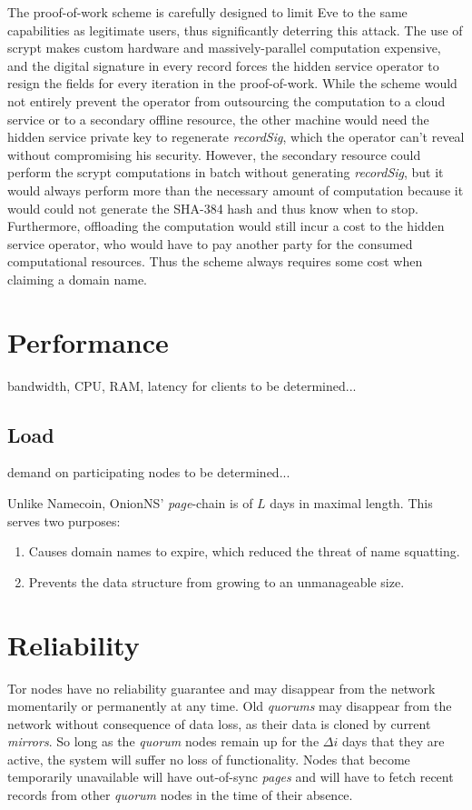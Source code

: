 The proof-of-work scheme is carefully designed to limit Eve to the same capabilities as legitimate users, thus significantly deterring this attack. The use of scrypt makes custom hardware and massively-parallel computation expensive, and the digital signature in every record forces the hidden service operator to resign the fields for every iteration in the proof-of-work. While the scheme would not entirely prevent the operator from outsourcing the computation to a cloud service or to a secondary offline resource, the other machine would need the hidden service private key to regenerate \emph{recordSig}, which the operator can't reveal without compromising his security. However, the secondary resource could perform the scrypt computations in batch without generating \emph{recordSig}, but it would always perform more than the necessary amount of computation because it would could not generate the SHA-384 hash and thus know when to stop. Furthermore, offloading the computation would still incur a cost to the hidden service operator, who would have to pay another party for the consumed computational resources. Thus the scheme always requires some cost when claiming a domain name.

\section{Performance}

bandwidth, CPU, RAM, latency for clients to be determined...

\subsection{Load}

demand on participating nodes to be determined...

Unlike Namecoin, OnionNS' \emph{page}-chain is of $ L $ days in maximal length. This serves two purposes:

\begin{enumerate}
	\item Causes domain names to expire, which reduced the threat of name squatting.
	\item Prevents the data structure from growing to an unmanageable size.
\end{enumerate}

\section{Reliability}


Tor nodes have no reliability guarantee and may disappear from the network momentarily or permanently at any time. Old \emph{quorums} may disappear from the network without consequence of data loss, as their data is cloned by current \emph{mirrors}. So long as the \emph{quorum} nodes remain up for the $ \Delta i $ days that they are active, the system will suffer no loss of functionality. Nodes that become temporarily unavailable will have out-of-sync \emph{pages} and will have to fetch recent records from other \emph{quorum} nodes in the time of their absence.



